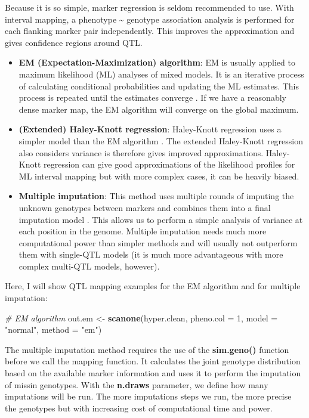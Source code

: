 \documentclass[12pt,]{krantz}
\makeatletter
\newenvironment{Shaded}{\begin{snugshade}}{\end{snugshade}}
\newcommand{\KeywordTok}[1]{\textcolor[rgb]{0.27,0.27,0.27}{\textbf{{#1}}}}
\newcommand{\DataTypeTok}[1]{\textcolor[rgb]{0.27,0.27,0.27}{{#1}}}
\newcommand{\DecValTok}[1]{\textcolor[rgb]{0.06,0.06,0.06}{{#1}}}
\newcommand{\StringTok}[1]{\textcolor[rgb]{0.5,0.5,0.5}{{#1}}}
\newcommand{\CommentTok}[1]{\textcolor[rgb]{0.37,0.37,0.37}{\textit{{#1}}}}
\newcommand{\NormalTok}[1]{{#1}}
\providecommand{\tightlist}{%
  \setlength{\itemsep}{0pt}\setlength{\parskip}{0pt}}
\newenvironment{kframe}{%
\medskip{}
\setlength{\fboxsep}{.8em}
 \def\at@end@of@kframe{}%
 \ifinner\ifhmode%
  \def\at@end@of@kframe{\end{minipage}}%
  \begin{minipage}{\columnwidth}%
 \fi\fi%
 \def\FrameCommand##1{\hskip\@totalleftmargin \hskip-\fboxsep
 \colorbox{shadecolor}{##1}\hskip-\fboxsep
     \hskip-\linewidth \hskip-\@totalleftmargin \hskip\columnwidth}%
 \MakeFramed {\advance\hsize-\width
   \@totalleftmargin\z@ \linewidth\hsize
   \@setminipage}}%
 {\par\unskip\endMakeFramed%
 \at@end@of@kframe}
\renewenvironment{Shaded}{\begin{kframe}}{\end{kframe}}
\makeatother
\begin{document}
Because it is so simple, marker regression is seldom recommended to use.
With interval mapping, a phenotype \textasciitilde{} genotype
association analysis is performed for each flanking marker pair
independently. This improves the approximation and gives confidence
regions around QTL.

\begin{itemize}
\tightlist
\item
  \textbf{EM (Expectation-Maximization) algorithm}: EM is usually
  applied to maximum likelihood (ML) analyses of mixed models. It is an
  iterative process of calculating conditional probabilities and
  updating the ML estimates. This process is repeated until the
  estimates converge \citep{Lander185}. If we have a reasonably dense
  marker map, the EM algorithm will converge on the global maximum.
\item
  \textbf{(Extended) Haley-Knott regression}: Haley-Knott regression
  uses a simpler model than the EM algorithm \citep{Haley1992}. The
  extended Haley-Knott regression also considers variance is therefore
  gives improved approximations. Haley-Knott regression can give good
  approximations of the likelihood profiles for ML interval mapping but
  with more complex cases, it can be heavily biased.
\item
  \textbf{Multiple imputation}: This method uses multiple rounds of
  imputing the unknown genotypes between markers and combines them into
  a final imputation model \citep{Sen371}. This allows us to perform a
  simple analysis of variance at each position in the genome. Multiple
  imputation needs much more computational power than simpler methods
  and will usually not outperform them with single-QTL models (it is
  much more advantageous with more complex multi-QTL models, however).
\end{itemize}

Here, I will show QTL mapping examples for the EM algorithm and for
multiple imputation:

\begin{Shaded}
\begin{Highlighting}[]
\CommentTok{# EM algorithm}
\NormalTok{out.em <-}\StringTok{ }\KeywordTok{scanone}\NormalTok{(hyper.clean, }\DataTypeTok{pheno.col =} \DecValTok{1}\NormalTok{, }\DataTypeTok{model =} \StringTok{"normal"}\NormalTok{, }\DataTypeTok{method =} \StringTok{"em"}\NormalTok{)}
\end{Highlighting}
\end{Shaded}

The multiple imputation method requires the use of the
\textbf{sim.geno()} function before we call the mapping function. It
calculates the joint genotype distribution based on the available marker
information and uses it to perform the imputation of missin genotypes.
With the \textbf{n.draws} parameter, we define how many imputations will
be run. The more imputations steps we run, the more precise the
genotypes but with increasing cost of computational time and power.
\end{document}
